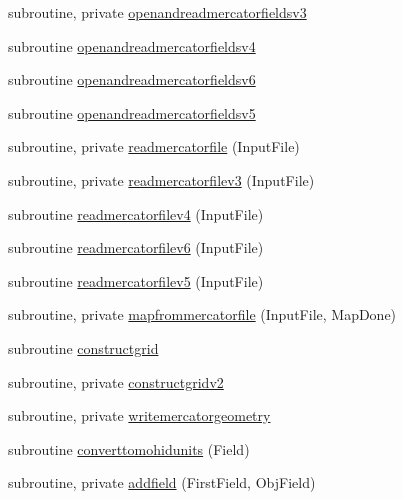 \begin{DoxyCompactItemize}
\item 
subroutine, private \mbox{\hyperlink{namespacemodulemercatorformat_a37b4ad910fc8c1eca130c7b29a79d828}{openandreadmercatorfieldsv3}}
\item 
subroutine \mbox{\hyperlink{namespacemodulemercatorformat_af19270e1386bf4e1df36be8a213e6370}{openandreadmercatorfieldsv4}}
\item 
subroutine \mbox{\hyperlink{namespacemodulemercatorformat_a4cccec2de301fe19e324230b88faa275}{openandreadmercatorfieldsv6}}
\item 
subroutine \mbox{\hyperlink{namespacemodulemercatorformat_afe37149b201bad497334d96a671ed27c}{openandreadmercatorfieldsv5}}
\item 
subroutine, private \mbox{\hyperlink{namespacemodulemercatorformat_a2f894929004ec4d27c855864f3122541}{readmercatorfile}} (Input\+File)
\item 
subroutine, private \mbox{\hyperlink{namespacemodulemercatorformat_a4f174ab179c1ebc3bd16e672df98d3e2}{readmercatorfilev3}} (Input\+File)
\item 
subroutine \mbox{\hyperlink{namespacemodulemercatorformat_a5bdb4983fc890f8f3c9d524bd6516d2c}{readmercatorfilev4}} (Input\+File)
\item 
subroutine \mbox{\hyperlink{namespacemodulemercatorformat_a581fc371026e728b42cbf50f824fc39f}{readmercatorfilev6}} (Input\+File)
\item 
subroutine \mbox{\hyperlink{namespacemodulemercatorformat_a66a44152e01a257880168d77ee61a18d}{readmercatorfilev5}} (Input\+File)
\item 
subroutine, private \mbox{\hyperlink{namespacemodulemercatorformat_a99c34f27fc6fb0d01e289f47e4e8a27b}{mapfrommercatorfile}} (Input\+File, Map\+Done)
\item 
subroutine \mbox{\hyperlink{namespacemodulemercatorformat_abe7eddb3220bab2097cf2622ced34f57}{constructgrid}}
\item 
subroutine, private \mbox{\hyperlink{namespacemodulemercatorformat_ab1d75b183b32a1b3d634bf12fcf66303}{constructgridv2}}
\item 
subroutine, private \mbox{\hyperlink{namespacemodulemercatorformat_a91963802a12780a4b2d6d09497ba91ac}{writemercatorgeometry}}
\item 
subroutine \mbox{\hyperlink{namespacemodulemercatorformat_afe587bb63f0975739ea6aae4c3ce6a6f}{converttomohidunits}} (Field)
\item 
subroutine, private \mbox{\hyperlink{namespacemodulemercatorformat_ad07eac9a69191b73461fe88c7b6540d1}{addfield}} (First\+Field, Obj\+Field)

\end{DoxyCompactItemize}
